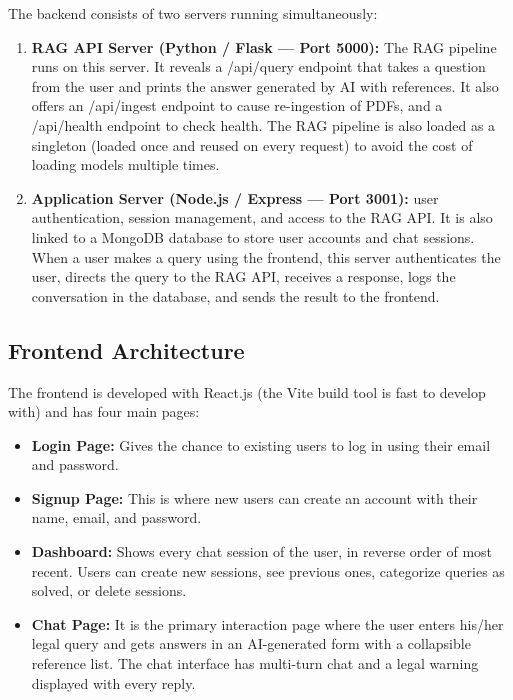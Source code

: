 \documentclass[12pt,a4paper]{article}
\begin{document}
The backend consists of two servers running simultaneously:

\begin{enumerate}
  \item \textbf{RAG API Server (Python / Flask --- Port 5000):} The RAG pipeline runs on this server. It reveals a /api/query endpoint that takes a question from the user and prints the answer generated by AI with references. It also offers an /api/ingest endpoint to cause re-ingestion of PDFs, and a /api/health endpoint to check health. The RAG pipeline is also loaded as a singleton (loaded once and reused on every request) to avoid the cost of loading models multiple times.
  

  \item \textbf{Application Server (Node.js / Express --- Port 3001):} user authentication, session management, and access to the RAG API. It is also linked to a MongoDB database to store user accounts and chat sessions. When a user makes a query using the frontend, this server authenticates the user, directs the query to the RAG API, receives a response, logs the conversation in the database, and sends the result to the frontend.
\end{enumerate}

\subsection{Frontend Architecture}

The frontend is developed with React.js (the Vite build tool is fast to develop with) and has four main pages:

\begin{itemize}
  \item \textbf{Login Page:} Gives the chance to existing users to log in using their email and password.
  \item \textbf{Signup Page:} This is where new users can create an account with their name, email, and password.
  \item \textbf{Dashboard:} Shows every chat session of the user, in reverse order of most recent. Users can create new sessions, see previous ones, categorize queries as solved, or delete sessions.

  \item \textbf{Chat Page:} It is the primary interaction page where the user enters his/her legal query and gets answers in an AI-generated form with a collapsible reference list. The chat interface has multi-turn chat and a legal warning displayed with every reply.
\end{itemize}
\end{document}

